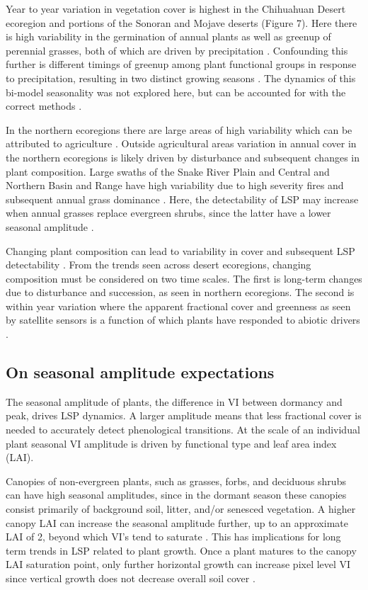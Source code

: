 \documentclass{article}
\begin{document}
Year to year variation in vegetation cover is highest in the Chihuahuan Desert ecoregion and portions of the Sonoran and Mojave deserts (Figure 7). Here there is high variability in the germination of annual plants as well as greenup of perennial grasses, both of which are driven by precipitation \cite{beatley1974a, browning2017b}. Confounding this further is different timings of greenup among plant functional groups in response to precipitation, resulting in two distinct growing seasons \cite{ernest2000, weiss2004, browning2018}. The dynamics of this bi-model seasonality was not explored here, but can be accounted for with the correct methods \cite{gray2019, buitenwerf2015}.

In the northern ecoregions there are large areas of high variability which can be attributed to agriculture \cite{bradley2008}. Outside agricultural areas variation in annual cover in the northern ecoregions is likely driven by disturbance and subsequent changes in plant composition. Large swaths of the Snake River Plain and Central and Northern Basin and Range have high variability due to high severity fires and subsequent annual grass dominance \cite{bradley2018, pastick2020}. Here, the detectability of LSP may increase when annual grasses replace evergreen shrubs, since the latter have a lower seasonal amplitude \cite{peng2021}.  

Changing plant composition can lead to variability in cover and subsequent LSP detectability \cite{chen-wang2018}. From the trends seen across desert ecoregions, changing composition must be considered on two time scales. The first is long-term changes due to disturbance and succession, as seen in northern ecoregions. The second is within year variation where the apparent fractional cover and greenness as seen by satellite sensors is a function of which plants have responded to abiotic drivers \cite{helman2018}. 

\subsection{On seasonal amplitude expectations}
The seasonal amplitude of plants, the difference in VI between dormancy and peak, drives LSP dynamics. A larger amplitude means that less fractional cover is needed to accurately detect phenological transitions. At the scale of an individual plant seasonal VI amplitude is driven by functional type and leaf area index (LAI).

Canopies of non-evergreen plants, such as grasses, forbs, and deciduous shrubs can have high seasonal amplitudes, since in the dormant season these canopies consist primarily of background soil, litter, and/or senesced vegetation. A higher canopy LAI can increase the seasonal amplitude further, up to an approximate LAI of 2, beyond which VI’s tend to saturate \cite{smith2019}. This has implications for long term trends in LSP related to plant growth. Once a plant matures to the canopy LAI saturation point, only further horizontal growth can increase pixel level VI since vertical growth does not decrease overall soil cover \cite{gamon1995, carlson1997}.
\end{document}
